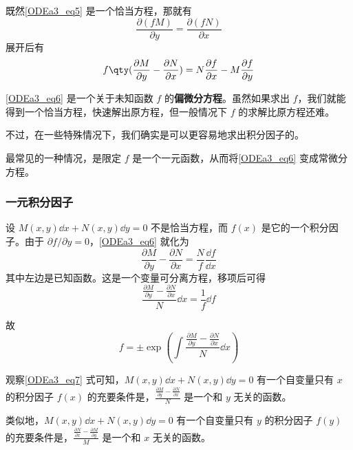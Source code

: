 既然\autoref{ODEa3_eq5} 是一个恰当方程，那就有
\begin{equation}
\frac{\partial (fM)}{\partial y}=\frac{\partial (fN)}{\partial x}
\end{equation}
展开后有
\begin{equation}\label{ODEa3_eq6}
f\qty(\frac{\partial M}{\partial y}-\frac{\partial N}{\partial x})=N\frac{\partial f}{\partial x}-M\frac{\partial f}{\partial y}
\end{equation}

\autoref{ODEa3_eq6} 是一个关于未知函数 $f$ 的\textbf{偏微分方程}。虽然如果求出 $f$，我们就能得到一个恰当方程，快速解出原方程，但一般情况下 $f$ 的求解比原方程还难。

不过，在一些特殊情况下，我们确实是可以更容易地求出积分因子的。

最常见的一种情况，是限定 $f$ 是一个一元函数，从而将\autoref{ODEa3_eq6} 变成常微分方程。

\subsubsection{一元积分因子}

设 $M(x, y)\dd x+N(x, y)\dd y=0$ 不是恰当方程，而 $f(x)$ 是它的一个积分因子。由于 $\partial f/\partial y=0$，\autoref{ODEa3_eq6} 就化为
\begin{equation}
\frac{\partial M}{\partial y}-\frac{\partial N}{\partial x}=\frac{N}{f}\frac{\dd f}{\dd x}
\end{equation}
其中左边是已知函数。这是一个变量可分离方程，移项后可得
\begin{equation}
\frac{\frac{\partial M}{\partial y}-\frac{\partial N}{\partial x}}{N}\dd x=\frac{1}{f}\dd f
\end{equation}

故
\begin{equation}\label{ODEa3_eq7}
f=\pm \exp(\int \frac{\frac{\partial M}{\partial y}-\frac{\partial N}{\partial x}}{N}\dd x)
\end{equation}

观察\autoref{ODEa3_eq7} 式可知，$M(x, y)\dd x+N(x, y)\dd y=0$ 有一个自变量只有 $x$ 的积分因子 $f(x)$ 的充要条件是，$\frac{\frac{\partial M}{\partial y}-\frac{\partial N}{\partial x}}{N}$ 是一个和 $y$ 无关的函数。

类似地，$M(x, y)\dd x+N(x, y)\dd y=0$ 有一个自变量只有 $y$ 的积分因子 $f(y)$ 的充要条件是，$\frac{\frac{\partial N}{\partial x}-\frac{\partial M}{\partial y}}{M}$ 是一个和 $x$ 无关的函数。

